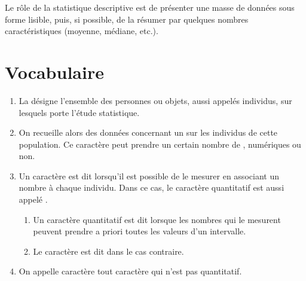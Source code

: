 

Le rôle de la statistique descriptive est de présenter une masse de
données sous forme lisible, puis, si possible, de la résumer par
quelques nombres caractéristiques (moyenne, médiane, etc.).




\section{Vocabulaire}

\begin{enumerate}
    \item La  désigne l'ensemble des personnes ou objets,
  aussi appelés individus, sur lesquels porte l'étude
  statistique.  
\item On recueille alors des données concernant un  sur
  les individus de cette population. Ce caractère peut prendre un
  certain nombre de , numériques ou non.
\item Un caractère est dit  lorsqu'il est possible de
  le mesurer en associant un nombre à chaque individu. Dans ce cas, le
  caractère quantitatif est aussi appelé .
  \begin{enumerate}
      \item Un caractère quantitatif est dit  lorsque les
    nombres qui le mesurent peuvent prendre a priori toutes les
    valeurs d'un intervalle.
\item Le caractère est dit  dans le cas contraire.
  \end{enumerate}
\item On appelle caractère  tout caractère qui n'est
  pas quantitatif.
\end{enumerate}


